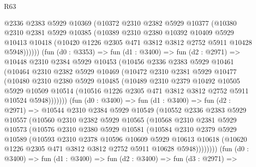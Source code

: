 \begin{lexlean}{R63}
\begin{coremodule}
            @2336
            @2383
            @5929
            @10369
            (@10372
              @2310
              @2382
              @5929
              @10377
              (@10380
                @2310
                @2381
                @5929
                @10385
                (@10389
                  @2310
                  @2380
                  @10392
                  @10409
                  @5929
                  @10413
                  @10418
                  (@10420 @1226 @2305 @471 @3812 @3812 @2752 @5911 @10428 @5948))))))
        (fun (d0 : @3353) =>
        fun (d1 : @3400) =>
        fun (d2 : @2971) =>
        @10448
          @2310
          @2384
          @5929
          @10453
          (@10456
            @2336
            @2383
            @5929
            @10461
            (@10464
              @2310
              @2382
              @5929
              @10469
              (@10472
                @2310
                @2381
                @5929
                @10477
                (@10480
                  @2310
                  @2380
                  @5929
                  @10485
                  (@10489
                    @2310
                    @2379
                    @10492
                    @10505
                    @5929
                    @10509
                    @10514
                    (@10516 @1226 @2305 @471 @3812 @3812 @2752 @5911 @10524 @5948)))))))
        (fun (d0 : @3400) =>
        fun (d1 : @3400) =>
        fun (d2 : @2971) =>
        @10544
          @2310
          @2384
          @5929
          @10549
          (@10552
            @2336
            @2383
            @5929
            @10557
            (@10560
              @2310
              @2382
              @5929
              @10565
              (@10568
                @2310
                @2381
                @5929
                @10573
                (@10576
                  @2310
                  @2380
                  @5929
                  @10581
                  (@10584
                    @2310
                    @2379
                    @5929
                    @10589
                    (@10593
                      @2310
                      @2378
                      @10596
                      @10609
                      @5929
                      @10613
                      @10618
                      (@10620 @1226 @2305 @471 @3812 @3812 @2752 @5911 @10628 @5948))))))))
        (fun (d0 : @3400) =>
        fun (d1 : @3400) =>
        fun (d2 : @3400) =>
        fun (d3 : @2971) =>

\end{coremodule}
\end{lexlean}
